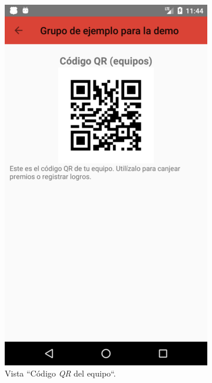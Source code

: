 \documentclass[twoside]{report}
\begin{document}
\begin{figure}[H]
\begin{center}
	\begin{subfigure}[t]{.3\linewidth}
		\includegraphics[scale=0.2]{images/userguide/19.png}
		\caption{Vista “Código \textit{QR} del equipo“.}
	\end{subfigure}\hspace{5mm}%
	\begin{subfigure}[t]{.3\linewidth}

\end{subfigure}
\end{center}
\end{figure}
\end{document}
